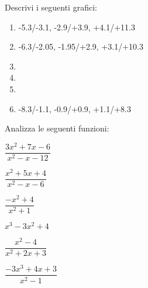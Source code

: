\begin{esercizio}\label{ese:stufun.4g}
Descrivi i seguenti grafici:
\begin{multicols}{2}
 \begin{enumerate} [left=0pt, label=\alph*)]
  \item \myp 
{} 
{-5.3/-3.1, -2.9/+3.9, +4.1/+11.3}%
  \item \myp 
{} 
{-6.3/-2.05, -1.95/+2.9, +3.1/+10.3}%
  \item \myp 
{}%
  \item \myp 
{} %
\item \myp 
{}%
\item \myp 
{}
{-8.3/-1.1, -0.9/+0.9, +1.1/+8.3}%
 \end{enumerate}
\end{multicols}
\end{esercizio}

\begin{esercizio}\label{ese:stufun.4e}
Analizza le seguenti funzioni:
\begin{multicols}{3}
 \begin{enumeratea}
  \item \(\dfrac{3x^2 +7x -6}{x^2 -x -12}\) %
  \item \(\dfrac{x^2+5x+4}{x^2-x-6}\) %
  \item \(\dfrac{-x^2 +4}{x^2 +1}\) %
  \item \(x^3 -3x^2 +4\) %
  \item \(\dfrac{x^2 -4}{x^2 +2x +3}\) %
  \item \(\dfrac{-3x^3 +4x +3}{x^2 -1}\) %
 \end{enumeratea}
\end{multicols}
\end{esercizio}

\bigskip

\bigskip

